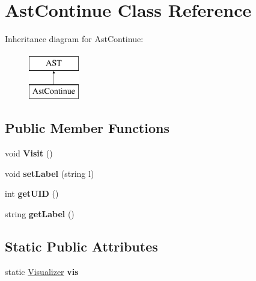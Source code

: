 \hypertarget{classAstContinue}{\section{Ast\-Continue Class Reference}
\label{classAstContinue}
}
Inheritance diagram for Ast\-Continue\-:\begin{figure}[H]
\begin{center}
\leavevmode
\includegraphics[height=2.000000cm]{classAstContinue}
\end{center}
\end{figure}
\subsection*{Public Member Functions}
\begin{DoxyCompactItemize}
\item 
\hypertarget{classAstContinue_a5e3d13c7d6c9077f7a3d50683746c518}{void {\bfseries Visit} ()}\label{classAstContinue_a5e3d13c7d6c9077f7a3d50683746c518}

\item 
\hypertarget{classAST_a71d680856e95ff89f55d5311a552eba6}{void {\bfseries set\-Label} (string l)}\label{classAST_a71d680856e95ff89f55d5311a552eba6}

\item 
\hypertarget{classAST_ab7a5b1d9f1c2de0d98deb356f724a42c}{int {\bfseries get\-U\-I\-D} ()}\label{classAST_ab7a5b1d9f1c2de0d98deb356f724a42c}

\item 
\hypertarget{classAST_aee029be902fffc927d16ccb03eb922ad}{string {\bfseries get\-Label} ()}\label{classAST_aee029be902fffc927d16ccb03eb922ad}

\end{DoxyCompactItemize}
\subsection*{Static Public Attributes}
\begin{DoxyCompactItemize}
\item 
\hypertarget{classAST_aca9e6637209b31e03a09c0d42f29bdfa}{static \hyperlink{classVisualizer}{Visualizer} {\bfseries vis}}\label{classAST_aca9e6637209b31e03a09c0d42f29bdfa}

\end{DoxyCompactItemize}
